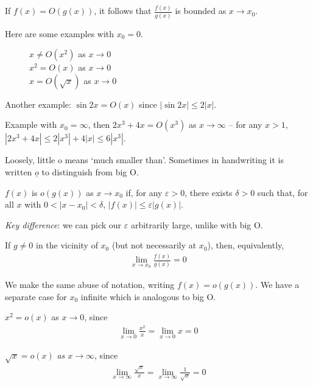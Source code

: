 \documentclass{../template/note}
\begin{document}
    \begin{remark*}
        If \(f(x) = O(g(x))\), it follows that \(\frac{f(x)}{g(x)}\) is bounded as \(x \to x_0\).
    \end{remark*}

    
    Here are some examples with \(x_0 = 0\).
    
    \begin{figure}[ht]
        \centering
        \caption{\(x \neq O(x^2)\) as \(x \to 0\) \\ \(x^2 = O(x)\) as \(x \to 0\) \\ \(x = O(\sqrt x)\) as \(x \to 0\)}
        \label{fig:big-O-demo}
    \end{figure}
    
    Another example: \(\sin 2x = O(x)\) since \(|\sin 2x| \leq 2|x|\).
    
    Example with \(x_0 = \infty\), then \(2x^3 + 4x = O(x^3)\) as \(x \to \infty\) -- for any \(x > 1\), \(|2x^3 + 4x| \leq 2|x^3| + 4|x| \leq 6|x^3|\).

    \begin{definition}[Little o]
        Loosely, little o means `much smaller than'. Sometimes in handwriting it is written \(\underline o\) to distinguish from big O.

        \(f(x)\) is \(o(g(x))\) as \(x \to x_0\) if, for any \(\varepsilon > 0\), there exists \(\delta > 0\) such that, for all \(x\) with \(0 < |x-x_0| < \delta\), \(|f(x)| \leq \varepsilon|g(x)|\).

        \emph{Key difference}: we can pick our \(\varepsilon\) arbitrarily large, unlike with big O.

        If \(g \neq 0\) in the vicinity of \(x_0\) (but not necessarily at \(x_0\)), then, equivalently,
        \begin{align*}
            \lim_{x\to x_0} \frac{f(x)}{g(x)} = 0
        \end{align*}

        We make the same abuse of notation, writing \(f(x) = o(g(x))\). We have a separate case for \(x_0\) infinite which is analogous to big O.
    \end{definition}

    \begin{example}
        \(x^2 = o(x)\) as \(x \to 0\), since
        \begin{align*}
            \lim_{x \to 0}\frac{x^2}{x} = \lim_{x \to 0} x = 0
        \end{align*}
        
        \(\sqrt x = o(x)\) \emph{as \(x \to \infty\)}, since
        \begin{align*}
            \lim_{x \to \infty}\frac{\sqrt x}{x} = \lim_{x \to \infty} \frac{1}{\sqrt x} = 0
        \end{align*}
        
        
    \end{example}
\end{document}
